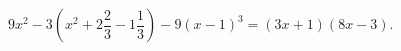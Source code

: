 \begin{ex}[type=equation]
	\begin{condition}
		$9x^2 - 3\left(x^2 +2\dfrac{2}{3}-1\dfrac{1}{3}\right) - 9(x - 1)^3 = (3x  + 1)(8x - 3).$
	\end{condition}
\end{ex}